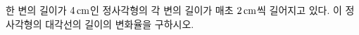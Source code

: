한 변의 길이가 $4\mkern3mu \mathrm{cm}$인 정사각형의 각 변의 길이가 매초 $2\mkern3mu \mathrm{cm}$씩 길어지고 있다. 이 정사각형의 대각선의 길이의 변화율을 구하시오.
